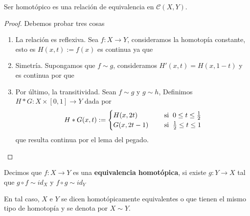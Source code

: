 \documentclass{article}
\begin{document}
\vspace{2mm}
\begin{prop}
    Ser homotópico es una relación de equivalencia en $\mathcal{C}(X,Y)$.
\end{prop}
\begin{proof}
    Debemos probar tres cosas
    \begin{enumerate}
        \item La relación es reflexiva. Sea $f:X\to Y$, consideramos la homotopía constante, esto
        es $H(x,t):=f(x)$ es continua ya que

        \centerline{
        }
        \item Simetría. Supongamos que $f\sim g$, consideramos $H'(x,t)=H(x,1-t)$ y es continua
        por que
        
        \vspace{2mm}
        \centerline{
            \xymatrixcolsep{3pc}
        }
        \item Por último, la transitividad. Sean $f\sim g$ y $g\sim h$, Definimos 
        $H*G:X\times[0,1]\to Y$ dada por
        \begin{equation*}
            H*G(x,t):=\begin{cases}
                H(x,2t) &\quad\text{ si}\hspace{2mm}0\leq t\leq\frac{1}{2} \\
                G(x,2t-1) &\quad\text{ si}\hspace{2mm}\frac{1}{2}\leq t\leq1
            \end{cases}
        \end{equation*}
        que resulta continua por el lema del pegado.
    \end{enumerate}
\end{proof}

\newpage
\vspace{2mm}
\begin{dfn}
    Decimos que $f:X\to Y$ es una \textbf{equivalencia homotópica}, si existe $g:Y\to X$ tal que 
    $g\circ f\sim id_{X}$ y $f\circ g\sim id_{Y}$
\end{dfn}
\noindent En tal caso, $X$ e $Y$ se dicen homotópicamente equivalentes o que tienen el mismo tipo 
de homotopía y se denota por $X\sim Y$.
\end{document}
